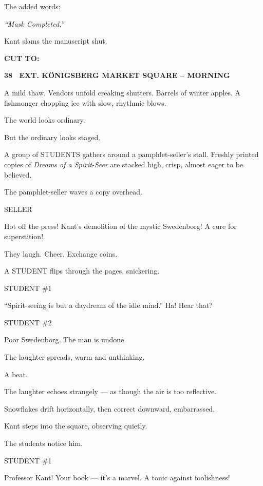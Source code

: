 \documentclass[12pt]{article}
\newcommand{\scene}[2]{%
  \vspace{1.8\baselineskip}%
  \noindent\textbf{#1 \ #2}\par\vspace{0.4\baselineskip}%
}
\newenvironment{dialogue}[1]{%
  \vspace{0.8\baselineskip}%
  \noindent\hspace*{2.3in}\textsc{#1}\par%
  \noindent\hspace*{1.5in}\begin{minipage}[t]{4.5in}%
}{%
  \end{minipage}\par%
}
\newcommand{\transition}[1]{%
  \vspace{0.6\baselineskip}%
  \begin{flushright}\textbf{#1}\end{flushright}%
}
\begin{document}
The added words:

\textit{“Mask Completed.”}

Kant slams the manuscript shut.

\transition{CUT TO:}


\scene{38}{EXT. KÖNIGSBERG MARKET SQUARE -- MORNING}

A mild thaw. Vendors unfold creaking shutters. Barrels of winter apples. 
A fishmonger chopping ice with slow, rhythmic blows.

The world looks ordinary.

But the ordinary looks staged.

A group of STUDENTS gathers around a pamphlet-seller's stall. 
Freshly printed copies of \textit{Dreams of a Spirit-Seer} are stacked high,
crisp, almost eager to be believed.

The pamphlet-seller waves a copy overhead.

\begin{dialogue}{SELLER}
Hot off the press!  
Kant’s demolition of the mystic Swedenborg!  
A cure for superstition!
\end{dialogue}

They laugh. Cheer. Exchange coins.

A STUDENT flips through the pages, snickering.

\begin{dialogue}{STUDENT \#1}
“Spirit-seeing is but a daydream of the idle mind.”  
Ha! Hear that?
\end{dialogue}

\begin{dialogue}{STUDENT \#2}
Poor Swedenborg. The man is undone.
\end{dialogue}

The laughter spreads, warm and unthinking.

A beat.

The laughter echoes strangely — as though the air is too reflective.

Snowflakes drift horizontally, then correct downward, embarrassed.

Kant steps into the square, observing quietly.

The students notice him.

\begin{dialogue}{STUDENT \#1}
Professor Kant!  
Your book — it’s a marvel. A tonic against foolishness!
\end{dialogue}
\end{document}
